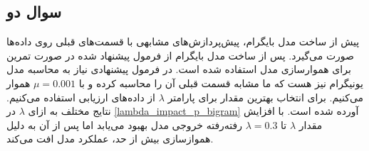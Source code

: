 \documentclass[12pt, a4paper]{book}
\begin{document}
\begin{table}[h]

\end{table}

\subsection*{سوال دو}

پیش از ساخت مدل بایگرام، پیش‌پردازش‌های مشابهی با قسمت‌های قبلی روی داده‌ها صورت می‌گیرد.
پس از ساخت مدل بایگرام از فرمول پیشنهاد شده در صورت تمرین برای هموار‌سازی مدل استفاده شده است.
در فرمول پیشنهادی نیاز به محاسبه مدل یونیگرام نیز هست که ما مشابه قسمت قبلی آن را محاسبه کرده و
با $\mu=0.001$ هموار می‌کنیم. برای انتخاب بهترین مقدار برای پارامتر $\lambda$ از داده‌های ارزیابی استفاده می‌کنیم.
نتایج مختلف به ازای $\lambda$ در \autoref{lambda_impact_p_bigram} آورده شده است. با افزایش مقدار $\lambda$
تا $\lambda=0.3$ رفته‌رفته خروجی مدل بهبود می‌یابد اما پس از آن به دلیل همواز‌سازی بیش از حد،
عملکرد مدل افت می‌کند.
\end{document}
